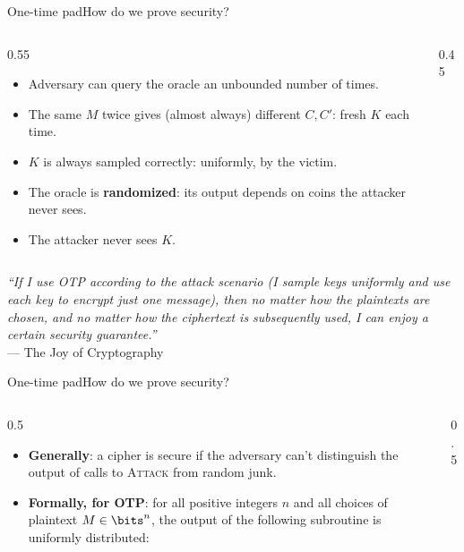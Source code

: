 \ifdefined\PRESENTATION\else\PassOptionsToClass{handout}{beamer}\fi\documentclass[aspectratio=169, lualatex]{beamer}
\begin{document}
\begin{frame}{One-time pad}{How do we prove security?}
	\begin{columns}[c]
		\begin{column}{0.55\textwidth}
			\begin{itemize}[<+->]
				\item Adversary can query the oracle an unbounded number of times.
				\item The same $M$ twice gives (almost always) different $C, C'$: fresh $K$ each time.
				\item $K$ is always sampled correctly: uniformly, by the victim.
				\item The oracle is \textbf{randomized}: its output depends on coins the attacker never sees.
				\item The attacker never sees $K$.
			\end{itemize}
		\end{column}
		\begin{column}{0.45\textwidth}
		\end{column}
	\end{columns}
\end{frame}

\begin{frame}
	\begin{center}
		\Large\textit{``If I use OTP according to the attack scenario (I sample keys uniformly and use each key to encrypt just one message), then no matter how the plaintexts are chosen, and no matter how the ciphertext is subsequently used, I can enjoy a certain security guarantee.''}\\[1em]
		{\normalsize --- The Joy of Cryptography}
	\end{center}
\end{frame}

\begin{frame}{One-time pad}{How do we prove security?}
	\begin{columns}[c]
		\begin{column}{0.5\textwidth}
			\begin{itemize}[<+->]
				\item \textbf{Generally}: a cipher is secure if the adversary can't distinguish the output of calls to \textsc{Attack} from random junk.
				\item \textbf{Formally, for OTP}: for all positive integers $n$ and all choices of plaintext $M \in \bits^n$, the output of the following subroutine is uniformly distributed:
			\end{itemize}
		\end{column}
		\begin{column}{0.5\textwidth}
		\end{column}
	\end{columns}
\end{frame}
\end{document}
